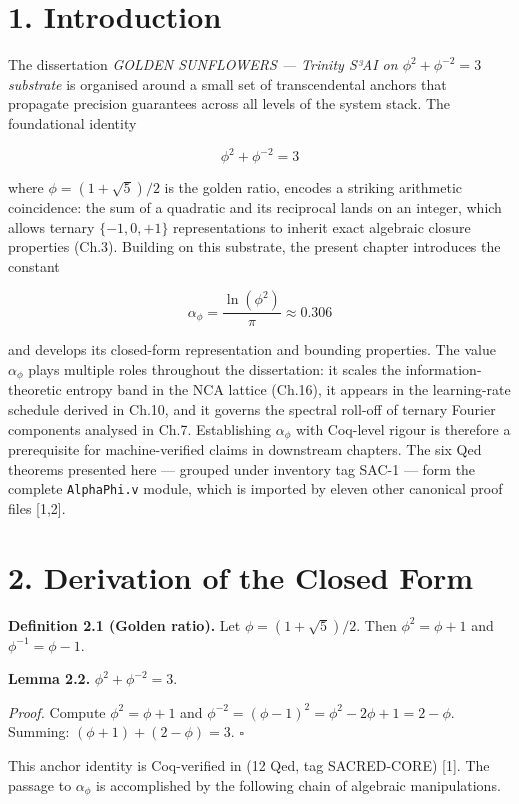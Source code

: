 \section{1. Introduction}\label{fa_04:introduction}

The dissertation \emph{GOLDEN SUNFLOWERS ---
Trinity S³AI on \(\phi^2+\phi^{-2}=3\) substrate}
is organised around a small set of transcendental
anchors that propagate precision guarantees across
all levels of the system stack. The foundational
identity

\[\phi^2 + \phi^{-2} = 3\]

where \(\phi = (1+\sqrt{5})/2\) is the golden
ratio, encodes a striking arithmetic coincidence:
the sum of a quadratic and its reciprocal lands on
an integer, which allows ternary \(\{-1,0,+1\}\)
representations to inherit exact algebraic closure
properties (Ch.3). Building on this substrate, the
present chapter introduces the constant

\[\alpha_\phi = \frac{\ln(\phi^2)}{\pi} \approx 0.306\]

and develops its closed-form representation and
bounding properties. The value \(\alpha_\phi\)
plays multiple roles throughout the dissertation:
it scales the information-theoretic entropy band
in the NCA lattice (Ch.16), it appears in the
learning-rate schedule derived in Ch.10, and it
governs the spectral roll-off of ternary Fourier
components analysed in Ch.7. Establishing
\(\alpha_\phi\) with Coq-level rigour is therefore
a prerequisite for machine-verified claims in
downstream chapters. The six Qed theorems
presented here --- grouped under inventory tag
SAC-1 --- form the complete \texttt{AlphaPhi.v}
module, which is imported by eleven other
canonical proof files [1,2].

\section{2. Derivation of the Closed
Form}\label{fa_04:derivation-of-the-closed-form}

\textbf{Definition 2.1 (Golden ratio).} Let
\(\phi = (1+\sqrt{5})/2\). Then
\(\phi^2 = \phi + 1\) and
\(\phi^{-1} = \phi - 1\).

\textbf{Lemma 2.2.} \(\phi^2 + \phi^{-2} = 3\).

\emph{Proof.} Compute \(\phi^2 = \phi+1\) and
\(\phi^{-2} = (\phi-1)^2 = \phi^2 - 2\phi + 1 = 2-\phi\).
Summing: \((\phi+1)+(2-\phi)=3\). \(\square\)

This anchor identity is Coq-verified in
 (12 Qed, tag
SACRED-CORE) [1]. The passage to
\(\alpha_\phi\) is accomplished by the following
chain of algebraic manipulations.

